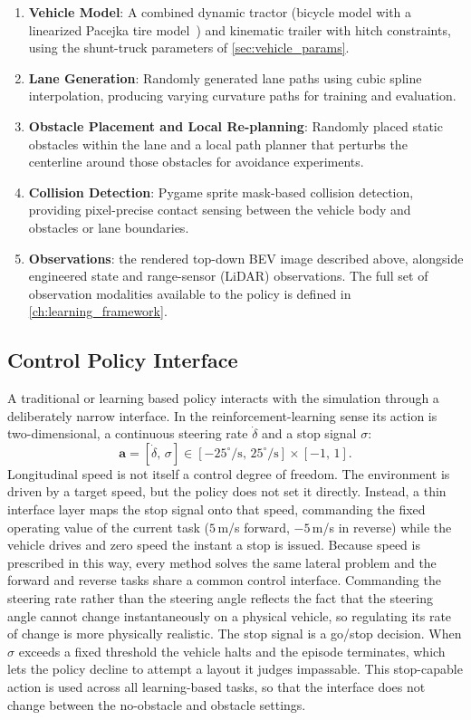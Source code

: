 \begin{enumerate}
    \item \textbf{Vehicle Model}: A combined dynamic tractor (bicycle model with a linearized Pacejka tire model~\cite{pacejka2012tyre}) and kinematic trailer with hitch constraints, using the shunt-truck parameters of \cref{sec:vehicle_params}.
    \item \textbf{Lane Generation}: Randomly generated lane paths using cubic spline interpolation, producing varying curvature paths for training and evaluation.
    \item \textbf{Obstacle Placement and Local Re-planning}: Randomly placed static obstacles within the lane and a local path planner that perturbs the centerline around those obstacles for avoidance experiments.
    \item \textbf{Collision Detection}: Pygame sprite mask-based collision detection, providing pixel-precise contact sensing between the vehicle body and obstacles or lane boundaries.
    \item \textbf{Observations}: the rendered top-down BEV image described above, alongside engineered state and range-sensor (LiDAR) observations. The full set of observation modalities available to the policy is defined in \cref{ch:learning_framework}.
\end{enumerate}

\subsection{Control Policy Interface}

A traditional or learning based policy interacts with the simulation through a deliberately narrow interface. In the reinforcement-learning sense its action is two-dimensional, a continuous steering rate $\dot{\delta}$ and a stop signal $\sigma$:
\begin{equation}
    \mathbf{a} = [\dot{\delta},\, \sigma] \in [-25^\circ/\text{s},\, 25^\circ/\text{s}] \times [-1,\, 1].
    \label{eq:action_space}
\end{equation}
Longitudinal speed is not itself a control degree of freedom. The environment is driven by a target speed, but the policy does not set it directly. Instead, a thin interface layer maps the stop signal onto that speed, commanding the fixed operating value of the current task ($5$\,m/s forward, $-5$\,m/s in reverse) while the vehicle drives and zero speed the instant a stop is issued. Because speed is prescribed in this way, every method solves the same lateral problem and the forward and reverse tasks share a common control interface. Commanding the steering rate rather than the steering angle reflects the fact that the steering angle cannot change instantaneously on a physical vehicle, so regulating its rate of change is more physically realistic. The stop signal is a go/stop decision. When $\sigma$ exceeds a fixed threshold the vehicle halts and the episode terminates, which lets the policy decline to attempt a layout it judges impassable. This stop-capable action is used across all learning-based tasks, so that the interface does not change between the no-obstacle and obstacle settings. 

